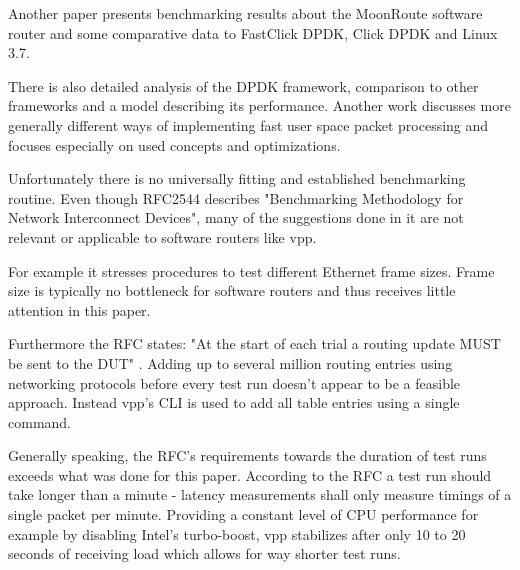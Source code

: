 Another paper \cite{chair:architecture} presents benchmarking results
about the MoonRoute software router and some comparative data to
FastClick DPDK, Click DPDK and Linux 3.7.  

There is also detailed analysis of the DPDK framework, comparison to
other frameworks and a model describing its performance. \cite
{compare-highperf} Another work discusses more generally different
ways of implementing fast user space packet processing and focuses
especially on used concepts and optimizations. \cite{barbette2015fast}


Unfortunately there is no universally fitting and established
benchmarking routine. Even though RFC2544 \cite{rfc2544} describes
"Benchmarking Methodology for Network Interconnect Devices", many of
the suggestions done in it are not relevant or applicable to software
routers like \Ac{vpp}. \cite{revisiting-benchmarking:1}



For example it stresses procedures to test different Ethernet frame
sizes. Frame size is typically no bottleneck for software routers and
thus receives little attention in this paper.
\cite{emmerich2015assessing}


Furthermore the RFC states: "At the start of each trial a routing
update MUST be sent to the DUT" \cite{rfc2544}. Adding up to several
million routing entries using networking protocols before every test
run doesn't appear to be a feasible approach. Instead \Ac{vpp}'s CLI
is used to add all table entries using a single command.


Generally speaking, the RFC's requirements towards the duration of
test runs exceeds what was done for this paper. According to the RFC a
test run should take longer than a minute - latency measurements shall
only measure timings of a single packet per minute. Providing a
constant level of CPU performance for example by disabling Intel's
turbo-boost, \Ac{vpp} stabilizes after only 10 to 20 seconds of
receiving load which allows for way shorter test runs.

